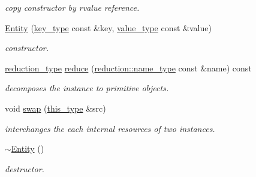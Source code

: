\begin{DoxyCompactItemize}
\begin{DoxyCompactList}\small\item\em copy constructor by rvalue reference. \end{DoxyCompactList}\item 
\hypertarget{classhryky_1_1http_1_1header_1_1accept_1_1extension_1_1_entity_a62867b809c7732ea7a28852b2e81e610}{\hyperlink{classhryky_1_1http_1_1header_1_1accept_1_1extension_1_1_entity_a62867b809c7732ea7a28852b2e81e610}{Entity} (\hyperlink{classhryky_1_1_vector}{key\-\_\-type} const \&key, \hyperlink{classhryky_1_1_vector}{value\-\_\-type} const \&value)}\label{classhryky_1_1http_1_1header_1_1accept_1_1extension_1_1_entity_a62867b809c7732ea7a28852b2e81e610}

\begin{DoxyCompactList}\small\item\em constructor. \end{DoxyCompactList}\item 
\hypertarget{classhryky_1_1http_1_1header_1_1accept_1_1extension_1_1_entity_a8a6dd2ce69f8be4d42485068ec8e68dc}{\hyperlink{namespacehryky_a343a9a4c36a586be5c2693156200eadc}{reduction\-\_\-type} \hyperlink{classhryky_1_1http_1_1header_1_1accept_1_1extension_1_1_entity_a8a6dd2ce69f8be4d42485068ec8e68dc}{reduce} (\hyperlink{namespacehryky_1_1reduction_ac686c30a4c8d196bbd0f05629a6b921f}{reduction\-::name\-\_\-type} const \&name) const }\label{classhryky_1_1http_1_1header_1_1accept_1_1extension_1_1_entity_a8a6dd2ce69f8be4d42485068ec8e68dc}

\begin{DoxyCompactList}\small\item\em decomposes the instance to primitive objects. \end{DoxyCompactList}\item 
\hypertarget{classhryky_1_1http_1_1header_1_1accept_1_1extension_1_1_entity_a7bf45d3bee70a2dfb25cf65fcaa5aee4}{void \hyperlink{classhryky_1_1http_1_1header_1_1accept_1_1extension_1_1_entity_a7bf45d3bee70a2dfb25cf65fcaa5aee4}{swap} (\hyperlink{classhryky_1_1http_1_1header_1_1accept_1_1extension_1_1_entity_af85519f63bfc6a712cf0885ac9d55dbf}{this\-\_\-type} \&src)}\label{classhryky_1_1http_1_1header_1_1accept_1_1extension_1_1_entity_a7bf45d3bee70a2dfb25cf65fcaa5aee4}

\begin{DoxyCompactList}\small\item\em interchanges the each internal resources of two instances. \end{DoxyCompactList}\item 
\hypertarget{classhryky_1_1http_1_1header_1_1accept_1_1extension_1_1_entity_afcc6ed39e2553798f45b1308c22bb9d4}{\hyperlink{classhryky_1_1http_1_1header_1_1accept_1_1extension_1_1_entity_afcc6ed39e2553798f45b1308c22bb9d4}{$\sim$\-Entity} ()}\label{classhryky_1_1http_1_1header_1_1accept_1_1extension_1_1_entity_afcc6ed39e2553798f45b1308c22bb9d4}

\begin{DoxyCompactList}\small\item\em destructor. \end{DoxyCompactList}\end{DoxyCompactItemize}
